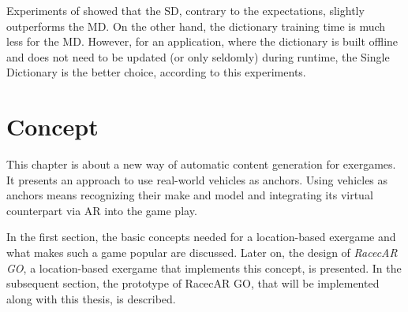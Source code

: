 Experiments of \citep{siddiqui2015robust} showed that the SD, contrary to the expectations, slightly outperforms the MD. On the other hand, the dictionary training time is much less for the MD. However, for an application, where the dictionary is built offline and does not need to be updated (or only seldomly) during runtime, the Single Dictionary is the better choice, according to this experiments.












\chapter{Concept}\label{ch:concept}
This chapter is about a new way of automatic content generation for exergames. It presents an approach to use real-world vehicles as anchors. Using vehicles as anchors means recognizing their make and model and integrating its virtual counterpart via AR into the game play.

In the first section, the basic concepts needed for a location-based exergame and what makes such a game popular are discussed. Later on, the design of \emph{RacecAR GO}, a location-based exergame that implements this concept, is presented. In the subsequent section, the prototype of RacecAR GO, that will be implemented along with this thesis, is described.

